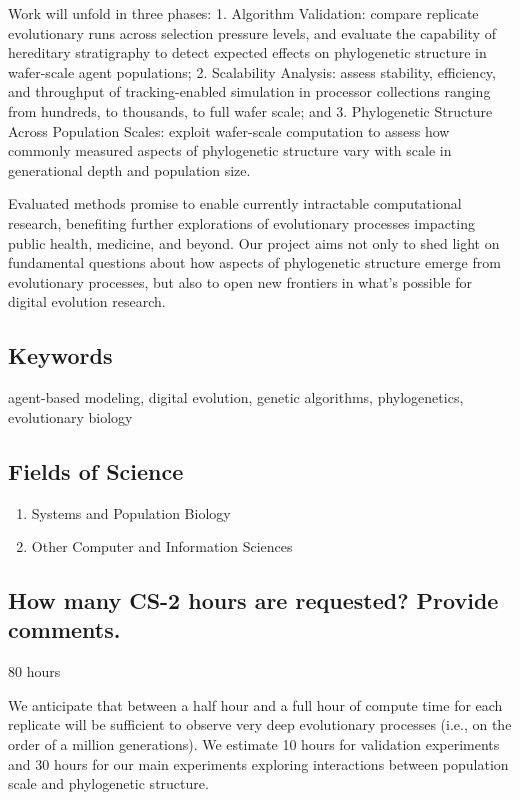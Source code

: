 Work will unfold in three phases:
1. Algorithm Validation: compare replicate evolutionary runs across selection pressure levels, and evaluate the capability of hereditary stratigraphy to detect expected effects on phylogenetic structure in wafer-scale agent populations;
2. Scalability Analysis: assess stability, efficiency, and throughput of tracking-enabled simulation in processor collections ranging from hundreds, to thousands, to full wafer scale; and
3. Phylogenetic Structure Across Population Scales: exploit wafer-scale computation to assess how commonly measured aspects of phylogenetic structure vary with scale in generational depth and population size.

Evaluated methods promise to enable currently intractable computational research, benefiting further explorations of evolutionary processes impacting public health, medicine, and beyond.
Our project aims not only to shed light on fundamental questions about how aspects of phylogenetic structure emerge from evolutionary processes, but also to open new frontiers in what's possible for digital evolution research.

\subsection{Keywords}

agent-based modeling, digital evolution, genetic algorithms, phylogenetics, evolutionary biology

\subsection{Fields of Science}

\begin{enumerate}
    \item Systems and Population Biology
    \item Other Computer and Information Sciences
\end{enumerate}

\subsection{How many CS-2 hours are requested? Provide comments.}

80 hours

We anticipate that between a half hour and a full hour of compute time for each replicate will be sufficient to observe very deep evolutionary processes (i.e., on the order of a million generations).
We estimate 10 hours for validation experiments and 30 hours for our main experiments exploring interactions between population scale and phylogenetic structure.

